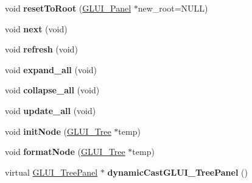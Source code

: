 \begin{DoxyCompactItemize}
\item 
\hypertarget{class_g_l_u_i___tree_panel_afb0e79d1dc91dc54a68b1a8713b8c304}{void {\bfseries reset\+To\+Root} (\hyperlink{class_g_l_u_i___panel}{G\+L\+U\+I\+\_\+\+Panel} $\ast$new\+\_\+root=N\+U\+L\+L)}\label{class_g_l_u_i___tree_panel_afb0e79d1dc91dc54a68b1a8713b8c304}

\item 
\hypertarget{class_g_l_u_i___tree_panel_a1f7f1fbf6bc2981fcbc6e18d411282ec}{void {\bfseries next} (void)}\label{class_g_l_u_i___tree_panel_a1f7f1fbf6bc2981fcbc6e18d411282ec}

\item 
\hypertarget{class_g_l_u_i___tree_panel_a2ee78d8dc12158d0a238352b64fc8c40}{void {\bfseries refresh} (void)}\label{class_g_l_u_i___tree_panel_a2ee78d8dc12158d0a238352b64fc8c40}

\item 
\hypertarget{class_g_l_u_i___tree_panel_a8d49fb5df0741d2e5f00e90312f8c485}{void {\bfseries expand\+\_\+all} (void)}\label{class_g_l_u_i___tree_panel_a8d49fb5df0741d2e5f00e90312f8c485}

\item 
\hypertarget{class_g_l_u_i___tree_panel_aa0734d6f9d1ffb0b936207862931b369}{void {\bfseries collapse\+\_\+all} (void)}\label{class_g_l_u_i___tree_panel_aa0734d6f9d1ffb0b936207862931b369}

\item 
\hypertarget{class_g_l_u_i___tree_panel_ad47d4b3fc3126d22de92a69f1acfdbc0}{void {\bfseries update\+\_\+all} (void)}\label{class_g_l_u_i___tree_panel_ad47d4b3fc3126d22de92a69f1acfdbc0}

\item 
\hypertarget{class_g_l_u_i___tree_panel_acad3e81a379af8d21c03b142e383d25e}{void {\bfseries init\+Node} (\hyperlink{class_g_l_u_i___tree}{G\+L\+U\+I\+\_\+\+Tree} $\ast$temp)}\label{class_g_l_u_i___tree_panel_acad3e81a379af8d21c03b142e383d25e}

\item 
\hypertarget{class_g_l_u_i___tree_panel_abb0fcb52726f6253858721959cd3279a}{void {\bfseries format\+Node} (\hyperlink{class_g_l_u_i___tree}{G\+L\+U\+I\+\_\+\+Tree} $\ast$temp)}\label{class_g_l_u_i___tree_panel_abb0fcb52726f6253858721959cd3279a}

\item 
\hypertarget{class_g_l_u_i___tree_panel_ab8c16d602cbe718a8cac7505b42a0f3a}{virtual \hyperlink{class_g_l_u_i___tree_panel}{G\+L\+U\+I\+\_\+\+Tree\+Panel} $\ast$ {\bfseries dynamic\+Cast\+G\+L\+U\+I\+\_\+\+Tree\+Panel} ()}\label{class_g_l_u_i___tree_panel_ab8c16d602cbe718a8cac7505b42a0f3a}

\end{DoxyCompactItemize}
